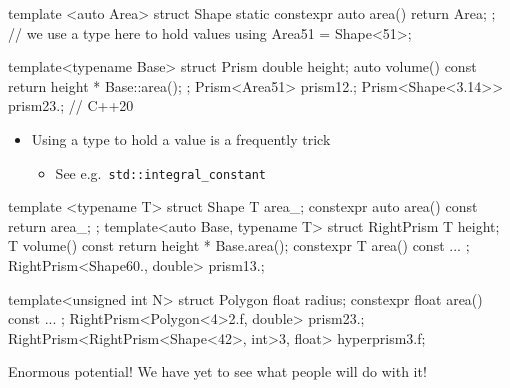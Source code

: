\begin{advanced}

\begin{frame}[fragile]
  \small
  \begin{cppcode}
    template <auto Area>
    struct Shape {
      static constexpr auto area() { return Area; }
    };
    // we use a type here to hold values
    using Area51 = Shape<51>;

    template<typename Base>
    struct Prism {
      double height;
      auto volume() const { return height * Base::area(); }
    };
    Prism<Area51>         prism1{2.};
    Prism<Shape<3.14>> prism2{3.}; // C++20
  \end{cppcode}
  \begin{block}{}
    \begin{itemize}
      \item Using a type to hold a value is a frequently trick
      \begin{itemize}
        \item See e.g.\ \texttt{std::integral_constant}
      \end{itemize}
    \end{itemize}
  \end{block}
\end{frame}

\begin{frame}[fragile]
  \footnotesize
  \begin{cppcode*}{}
    template <typename T> struct Shape {
      T area_;
      constexpr auto area() const { return area_; }
    };
    template<auto Base, typename T> struct RightPrism {
      T height;
      T volume() const { return height * Base.area(); }
      constexpr T area() const { ... }
    };
    RightPrism<Shape{60.}, double> prism1{3.};

    template<unsigned int N> struct Polygon {
      float radius;
      constexpr float area() const { ... }
    };
    RightPrism<Polygon<4>{2.f}, double> prism2{3.};
    RightPrism<RightPrism<Shape<42>, int>{3}, float> hyperprism{3.f};
  \end{cppcode*}
  \begin{block}{}
    Enormous potential! We have yet to see what people will do with it!
  \end{block}
\end{frame}

\end{advanced}

